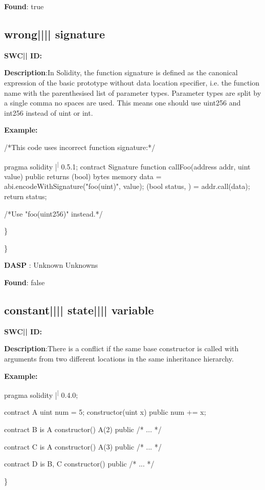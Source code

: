 \documentclass{article}
\begin{document}
\textbf{Found}: true

\subsection{wrong{||\textunderscore|| }signature} 
\textbf{SWC{|\textunderscore| }ID:} 

\textbf{Description}:In Solidity, the function signature is defined as the canonical expression of the basic prototype without data location specifier, i.e. the function name with the parenthesised list of parameter types. Parameter types are split by a single comma {\textendash} no spaces are used. This means one should use uint256 and int256 instead of uint or int.


\textbf{Example:} 
\begin{ffcode} 

 /*This code uses incorrect function signature:*/ 

pragma solidity |\textsuperscript| 0.5.1;
contract Signature {
    function callFoo(address addr, uint value) public returns (bool) {
        bytes memory data = abi.encodeWithSignature("foo(uint)", value);
        (bool status, ) = addr.call(data);
        return status;
    }
}

/*Use "foo(uint256)" instead.*/

\end{ffcode} 
\} 

\} 

\textbf{DASP} : Unknown Unknowns

\textbf{Found}: false

\subsection{constant{||\textunderscore|| }state{||\textunderscore|| }variable} 
\textbf{SWC{|\textunderscore| }ID:} 

\textbf{Description}:There is a conflict if the same base constructor is called with arguments from two different locations in the same inheritance hierarchy.


\textbf{Example:} 
\begin{ffcode} 

pragma solidity |\textsuperscript| 0.4.0;

contract A{
    uint num = 5;
    constructor(uint x) public{
        num += x;
    }
}

contract B is A{
    constructor() A(2) public { /* ... */ }
}

contract C is A {
    constructor() A(3) public { /* ... */ }
}

contract D is B, C {
    constructor() public { /* ... */ }
}

\end{ffcode} 
\} 
\end{document}
